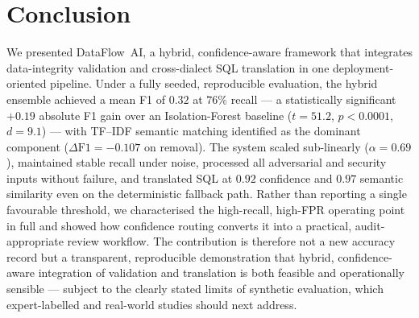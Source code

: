 \documentclass{ieeeaccess}
\begin{document}
\section{Conclusion}
\label{sec:conclusion}
We presented DataFlow~AI, a hybrid, confidence-aware framework that integrates data-integrity validation and cross-dialect
SQL translation in one deployment-oriented pipeline. Under a fully seeded, reproducible evaluation, the hybrid ensemble
achieved a mean F1 of $0.32$ at $76\%$ recall --- a statistically significant $+0.19$ absolute F1 gain over an
Isolation-Forest baseline ($t=51.2$, $p<0.0001$, $d=9.1$) --- with TF--IDF semantic matching identified as the dominant
component ($\Delta\mathrm{F1}=-0.107$ on removal). The system scaled sub-linearly ($\alpha=0.69$), maintained stable recall
under noise, processed all adversarial and security inputs without failure, and translated SQL at $0.92$ confidence and
$0.97$ semantic similarity even on the deterministic fallback path. Rather than reporting a single favourable threshold,
we characterised the high-recall, high-FPR operating point in full and showed how confidence routing converts it into a
practical, audit-appropriate review workflow. The contribution is therefore not a new accuracy record but a transparent,
reproducible demonstration that hybrid, confidence-aware integration of validation and translation is both feasible and
operationally sensible --- subject to the clearly stated limits of synthetic evaluation, which expert-labelled and
real-world studies should next address.
\end{document}
